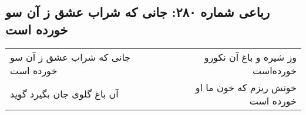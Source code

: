 \begin{center}
\section*{رباعی شماره ۲۸۰: جانی که شراب عشق ز آن سو خورده است}
\label{sec:0280}
\begin{longtable}{l p{0.5cm} r}
جانی که شراب عشق ز آن سو خورده است
&&
وز شیره و باغ آن نکورو خورده‌است
\\
آن باغ گلوی جان بگیرد گوید
&&
خونش ریزم که خون ما او خورده است
\\
\end{longtable}
\end{center}
